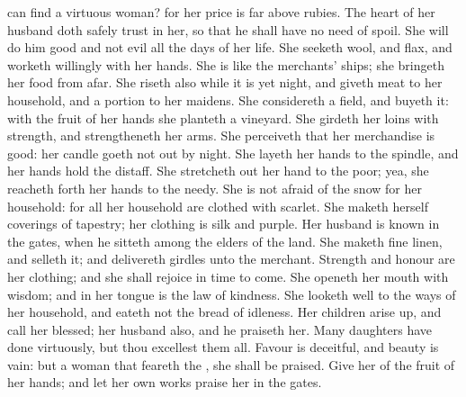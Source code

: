  can find a virtuous woman? for her price is far above rubies. The heart of her husband doth safely trust in her, so that he shall have no need of spoil. She will do him good and not evil all the days of her life. She seeketh wool, and flax, and worketh willingly with her hands. She is like the merchants' ships; she bringeth her food from afar. She riseth also while it is yet night, and giveth meat to her household, and a portion to her maidens. She considereth a field, and buyeth it: with the fruit of her hands she planteth a vineyard. She girdeth her loins with strength, and strengtheneth her arms. She perceiveth that her merchandise is good: her candle goeth not out by night. She layeth her hands to the spindle, and her hands hold the distaff. She stretcheth out her hand to the poor; yea, she reacheth forth her hands to the needy. She is not afraid of the snow for her household: for all her household are clothed with scarlet. She maketh herself coverings of tapestry; her clothing is silk and purple. Her husband is known in the gates, when he sitteth among the elders of the land. She maketh fine linen, and selleth it; and delivereth girdles unto the merchant. Strength and honour are her clothing; and she shall rejoice in time to come. She openeth her mouth with wisdom; and in her tongue is the law of kindness. She looketh well to the ways of her household, and eateth not the bread of idleness. Her children arise up, and call her blessed; her husband also, and he praiseth her. Many daughters have done virtuously, but thou excellest them all. Favour is deceitful, and beauty is vain: but a woman that feareth the , she shall be praised. Give her of the fruit of her hands; and let her own works praise her in the gates.


